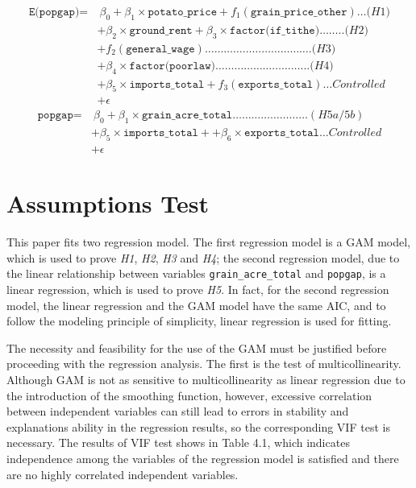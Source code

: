 \vspace{-14pt}
\begin{align*}
\texttt{E(popgap)} = & \ \beta_0 + \beta_1 \times \texttt{potato\_price} + f_1(\texttt{grain\_price\_other}) \ldots \textit{(H1)} \\
                & + \beta_2 \times \texttt{ground\_rent} + \beta_3 \times \texttt{factor(if\_tithe)} \ldots \ldots .. \textit{(H2)} \\
                & + f_2(\texttt{general\_wage}) \ldots \ldots \ldots \ldots \ldots \ldots \ldots \ldots \ldots \ldots \ldots . \textit{(H3)} \\
                & + \beta_4 \times \texttt{factor(poorlaw)} \ldots \ldots \ldots \ldots \ldots \ldots \ldots \ldots \ldots . .. \textit{(H4)} \\
                & + \beta_5 \times \texttt{imports\_total} + f_3(\texttt{exports\_total}) \ldots Controlled\\
                & + \epsilon
\end{align*}
\vspace{-2cm}
\begin{align*}
\texttt{popgap} = & \ \beta_0 + \beta_1 \times \texttt{grain\_acre\_total}  \ldots \ldots \ldots  \ldots \ldots \ldots \ldots \ldots (\textit{H5a/5b}) \\
& + \beta_5 \times \texttt{imports\_total} + + \beta_6 \times \texttt{exports\_total} \ldots Controlled\\
& + \epsilon
\end{align*}

\section{Assumptions Test}

This paper fits two regression model. The first regression model is a GAM model, which is used to prove \textit{H1}, \textit{H2}, \textit{H3} and \textit{H4}; the second regression model, due to the linear relationship between variables \texttt{grain\_acre\_total} and \texttt{popgap}, is a linear regression, which is used to prove \textit{H5}. In fact, for the second regression model, the linear regression and the GAM model have the same AIC, and to follow the modeling principle of simplicity, linear regression is used for fitting.

The necessity and feasibility for the use of the GAM must be justified before proceeding with the regression analysis. The first is the test of multicollinearity. Although GAM is not as sensitive to multicollinearity as linear regression due to the introduction of the smoothing function, however, excessive correlation between independent variables can still lead to errors in stability and explanations ability in the regression results, so the corresponding VIF test is necessary. The results of VIF test shows in Table 4.1, which indicates independence among the variables of the regression model is satisfied and there are no highly correlated independent variables.


